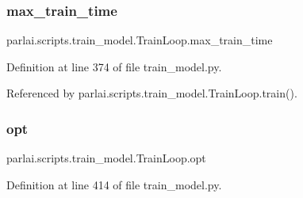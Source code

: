 \subsubsection{\texorpdfstring{max\+\_\+train\+\_\+time}{max\_train\_time}}
{\footnotesize\ttfamily parlai.\+scripts.\+train\+\_\+model.\+Train\+Loop.\+max\+\_\+train\+\_\+time}



Definition at line 374 of file train\+\_\+model.\+py.



Referenced by parlai.\+scripts.\+train\+\_\+model.\+Train\+Loop.\+train().

\mbox{\label{classparlai_1_1scripts_1_1train__model_1_1TrainLoop_a3f9cd4c0c08f457b3ecfd1e494ccf58c}} 
\subsubsection{\texorpdfstring{opt}{opt}}
{\footnotesize\ttfamily parlai.\+scripts.\+train\+\_\+model.\+Train\+Loop.\+opt}



Definition at line 414 of file train\+\_\+model.\+py.



